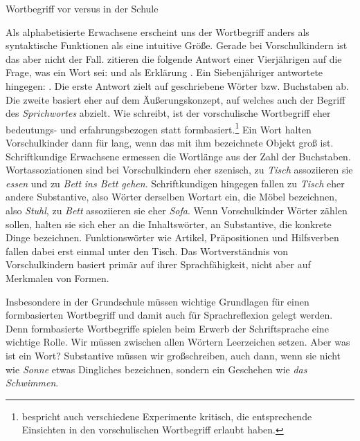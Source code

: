 \begin{Exkurs}{Wortbegriff vor versus in der Schule}\label{Exkurs:Wort_Schule}

Als alphabetisierte Erwachsene erscheint uns der Wortbegriff anders als syntaktische Funktionen als eine intuitive Größe. Gerade bei Vorschulkindern ist das aber nicht der Fall. \citet[110]{SteinigHuneke2015} zitieren die folgende Antwort einer Vierjährigen auf die Frage, was ein Wort sei:  und als Erklärung . Ein Siebenjähriger antwortete hingegen: . Die erste Antwort zielt auf geschriebene Wörter bzw. Buchstaben ab. Die zweite basiert eher auf dem Äußerungskonzept, auf welches auch der Begriff des \textit{Sprichwortes} abzielt. Wie \citet[55--56]{Bredel2013} schreibt, ist der vorschulische Wortbegriff eher bedeutungs-  und erfahrungsbezogen statt formbasiert.\footnote{\citet[52--57]{Bredel2013} bespricht auch verschiedene Experimente kritisch, die entsprechende Einsichten in den vorschulischen Wortbegriff erlaubt haben.} Ein Wort halten Vorschulkinder dann für lang, wenn das mit ihm bezeichnete Objekt groß ist. Schriftkundige Erwachsene ermessen die Wortlänge aus der Zahl der Buchstaben. Wortassoziationen sind bei Vorschulkindern eher szenisch, zu \textit{Tisch} assoziieren sie \textit{essen} und zu \textit{Bett} \zB \textit{ins Bett gehen}. Schriftkundigen hingegen fallen zu \textit{Tisch} eher andere Substantive, also Wörter derselben Wortart ein, die Möbel bezeichnen, also \zB \textit{Stuhl}, zu \textit{Bett} assoziieren sie eher  \textit{Sofa}. Wenn Vorschulkinder Wörter zählen sollen, halten sie sich eher an die Inhaltswörter, \zB an Substantive, die konkrete Dinge bezeichnen. Funktionswörter wie Artikel, Präpositionen und Hilfsverben fallen dabei erst einmal unter den Tisch. Das Wortverständnis von Vorschulkindern basiert primär auf ihrer Sprachfähigkeit, nicht aber auf Merkmalen von Formen.

Insbesondere in der Grundschule müssen wichtige Grundlagen für einen formbasierten Wortbegriff und damit auch für Sprachreflexion gelegt werden. Denn formbasierte Wortbegriffe spielen beim Erwerb der Schriftsprache eine wichtige Rolle. Wir müssen zwischen allen Wörtern Leerzeichen setzen. Aber was ist ein Wort? Substantive müssen wir großschreiben, auch dann, wenn sie nicht wie \textit{Sonne} etwas Dingliches bezeichnen, sondern \zB ein Geschehen wie \textit{das Schwimmen}. 


\end{Exkurs}
